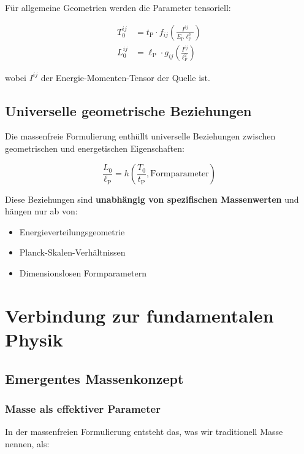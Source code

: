 \documentclass[12pt,a4paper]{article}
\newcommand{\Tzero}{T_0}
\newcommand{\lP}{\ell_{\text{P}}}
\newcommand{\tP}{t_{\text{P}}}
\newcommand{\EP}{E_{\text{P}}}
\begin{document}
	Für allgemeine Geometrien werden die Parameter tensoriell:
	
	\begin{align}
		\Tzero^{ij} &= \tP \cdot f_{ij}\left(\frac{I^{ij}}{\EP \lP^2}\right) \\
		L_0^{ij} &= \lP \cdot g_{ij}\left(\frac{I^{ij}}{\lP^2}\right)
	\end{align}
	
	wobei $I^{ij}$ der Energie-Momenten-Tensor der Quelle ist.
	
	\subsection{Universelle geometrische Beziehungen}
	\label{subsec:geometric_relations}
	
	Die massenfreie Formulierung enthüllt universelle Beziehungen zwischen geometrischen und energetischen Eigenschaften:
	
	\begin{equation}
		\frac{L_0}{\lP} = h\left(\frac{\Tzero}{\tP}, \text{Formparameter}\right)
		\label{eq:geometric_relation}
	\end{equation}
	
	Diese Beziehungen sind \textbf{unabhängig von spezifischen Massenwerten} und hängen nur ab von:
	\begin{itemize}
		\item Energieverteilungsgeometrie
		\item Planck-Skalen-Verhältnissen
		\item Dimensionslosen Formparametern
	\end{itemize}
	
	\section{Verbindung zur fundamentalen Physik}
	\label{sec:fundamental_connection}
	
	\subsection{Emergentes Massenkonzept}
	\label{subsec:emergent_mass}
	
	\subsubsection{Masse als effektiver Parameter}
	
	In der massenfreien Formulierung entsteht das, was wir traditionell Masse nennen, als:
	
\end{document}
